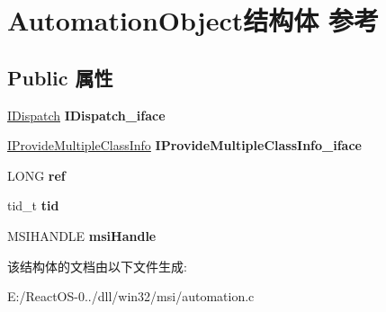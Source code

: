 \hypertarget{struct_automation_object}{}\section{Automation\+Object结构体 参考}
\label{struct_automation_object}
\subsection*{Public 属性}
\begin{DoxyCompactItemize}
\item 
\mbox{\label{struct_automation_object_a4bccd19c53797a4323faa80519973c4f}} 
\hyperlink{interface_i_dispatch}{I\+Dispatch} {\bfseries I\+Dispatch\+\_\+iface}
\item 
\mbox{\label{struct_automation_object_a3326d8b26951728bb584b22eb93a8d10}} 
\hyperlink{interface_i_provide_multiple_class_info}{I\+Provide\+Multiple\+Class\+Info} {\bfseries I\+Provide\+Multiple\+Class\+Info\+\_\+iface}
\item 
\mbox{\label{struct_automation_object_a7ff841446dcc960ae88f4f2de6976d96}} 
L\+O\+NG {\bfseries ref}
\item 
\mbox{\label{struct_automation_object_a0370812e28e02fa43c343914205e68e9}} 
tid\+\_\+t {\bfseries tid}
\item 
\mbox{\label{struct_automation_object_a4a3f107e99a98feba9a9184fd1795414}} 
M\+S\+I\+H\+A\+N\+D\+LE {\bfseries msi\+Handle}
\end{DoxyCompactItemize}


该结构体的文档由以下文件生成\+:\begin{DoxyCompactItemize}
\item 
E\+:/\+React\+O\+S-\/0../dll/win32/msi/automation.\+c\end{DoxyCompactItemize}
